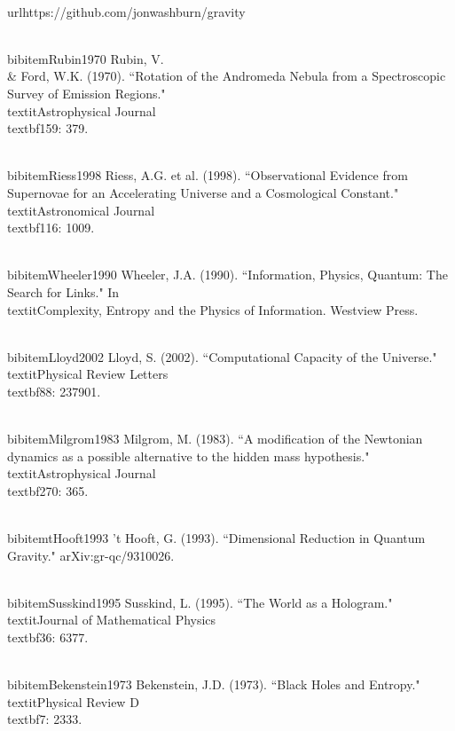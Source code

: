 \documentclass[twocolumn,prd,amsmath,amssymb,aps,superscriptaddress,nofootinbib]{revtex4-2}
\begin{document}
\\url{https://github.com/jonwashburn/gravity}

\begin{thebibliography}{99}

\\bibitem{Rubin1970} Rubin, V. \\& Ford, W.K. (1970). ``Rotation of the Andromeda Nebula from a Spectroscopic Survey of Emission Regions." \\textit{Astrophysical Journal} \\textbf{159}: 379.

\\bibitem{Riess1998} Riess, A.G. et al. (1998). ``Observational Evidence from Supernovae for an Accelerating Universe and a Cosmological Constant." \\textit{Astronomical Journal} \\textbf{116}: 1009.

\\bibitem{Wheeler1990} Wheeler, J.A. (1990). ``Information, Physics, Quantum: The Search for Links." In \\textit{Complexity, Entropy and the Physics of Information}. Westview Press.

\\bibitem{Lloyd2002} Lloyd, S. (2002). ``Computational Capacity of the Universe." \\textit{Physical Review Letters} \\textbf{88}: 237901.

\\bibitem{Milgrom1983} Milgrom, M. (1983). ``A modification of the Newtonian dynamics as a possible alternative to the hidden mass hypothesis." \\textit{Astrophysical Journal} \\textbf{270}: 365.

\\bibitem{tHooft1993} 't Hooft, G. (1993). ``Dimensional Reduction in Quantum Gravity." arXiv:gr-qc/9310026.

\\bibitem{Susskind1995} Susskind, L. (1995). ``The World as a Hologram." \\textit{Journal of Mathematical Physics} \\textbf{36}: 6377.

\\bibitem{Bekenstein1973} Bekenstein, J.D. (1973). ``Black Holes and Entropy." \\textit{Physical Review D} \\textbf{7}: 2333.


\end{thebibliography}
\end{document}
